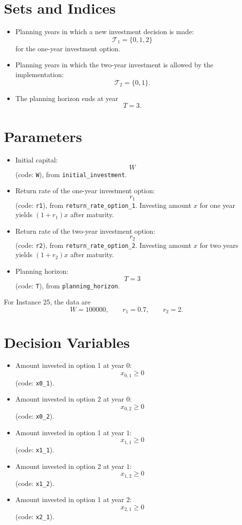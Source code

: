 \section*{Sets and Indices}

\begin{itemize}
    \item Planning years in which a new investment decision is made:
    \[
    \mathcal{T}_1 = \{0,1,2\}
    \]
    for the one-year investment option.
    \item Planning years in which the two-year investment is allowed by the implementation:
    \[
    \mathcal{T}_2 = \{0,1\}.
    \]
    \item The planning horizon ends at year
    \[
    T=3.
    \]
\end{itemize}

\section*{Parameters}

\begin{itemize}
    \item Initial capital:
    \[
    W
    \]
    (code: \texttt{W}), from \texttt{initial\_investment}.
    \item Return rate of the one-year investment option:
    \[
    r_1
    \]
    (code: \texttt{r1}), from \texttt{return\_rate\_option\_1}.
    Investing amount \(x\) for one year yields \((1+r_1)x\) after maturity.
    \item Return rate of the two-year investment option:
    \[
    r_2
    \]
    (code: \texttt{r2}), from \texttt{return\_rate\_option\_2}.
    Investing amount \(x\) for two years yields \((1+r_2)x\) after maturity.
    \item Planning horizon:
    \[
    T=3
    \]
    (code: \texttt{T}), from \texttt{planning\_horizon}.
\end{itemize}

For Instance 25, the data are
\[
W=100000,\qquad r_1=0.7,\qquad r_2=2.
\]

\section*{Decision Variables}

\begin{itemize}
    \item Amount invested in option 1 at year \(0\):
    \[
    x_{0,1}\ge 0
    \]
    (code: \texttt{x0\_1}).
    \item Amount invested in option 2 at year \(0\):
    \[
    x_{0,2}\ge 0
    \]
    (code: \texttt{x0\_2}).
    \item Amount invested in option 1 at year \(1\):
    \[
    x_{1,1}\ge 0
    \]
    (code: \texttt{x1\_1}).
    \item Amount invested in option 2 at year \(1\):
    \[
    x_{1,2}\ge 0
    \]
    (code: \texttt{x1\_2}).
    \item Amount invested in option 1 at year \(2\):
    \[
    x_{2,1}\ge 0
    \]
    (code: \texttt{x2\_1}).
\end{itemize}

